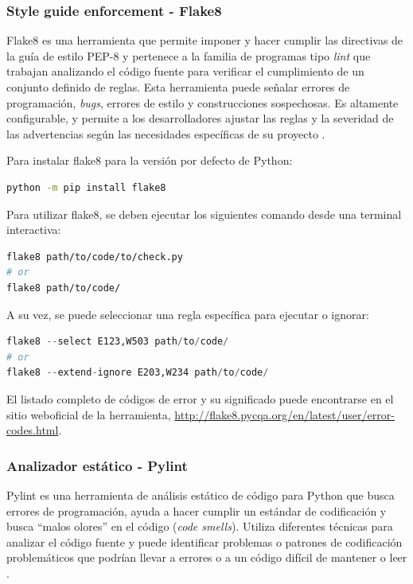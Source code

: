 \subsubsection{Style guide enforcement - Flake8}

Flake8 es una herramienta que permite imponer y hacer cumplir las directivas de la guía de estilo PEP-8 y pertenece a la familia de programas tipo \textit{lint} que trabajan analizando el código fuente para verificar el cumplimiento de un conjunto definido de reglas. Esta herramienta puede señalar errores de programación, \textit{bugs}, errores de estilo y construcciones sospechosas. Es altamente configurable, y permite a los desarrolladores ajustar las reglas y la severidad de las advertencias según las necesidades específicas de su proyecto \citep{flake8}.

Para instalar flake8 para la versión por defecto de Python:

\begin{lstlisting}[language=bash]
python -m pip install flake8
\end{lstlisting}

Para utilizar flake8, se deben ejecutar los siguientes comando desde una terminal interactiva:

\begin{lstlisting}[language=bash]
flake8 path/to/code/to/check.py
# or
flake8 path/to/code/
\end{lstlisting}


A su vez, se puede seleccionar una regla específica para ejecutar o ignorar:

\begin{lstlisting}[language={python}]
flake8 --select E123,W503 path/to/code/
# or
flake8 --extend-ignore E203,W234 path/to/code/
\end{lstlisting}

El listado completo de códigos de error y su significado puede encontrarse en el sitio weboficial de la herramienta, \url{http://flake8.pycqa.org/en/latest/user/error-codes.html}.

\subsubsection{Analizador estático - Pylint}
Pylint es una herramienta de análisis estático de código para Python que busca errores de programación, ayuda a hacer cumplir un estándar de codificación y busca ``malos olores'' en el código (\textit{code smells}). Utiliza diferentes técnicas para analizar el código fuente y puede identificar problemas o patrones de codificación problemáticos que podrían llevar a errores o a un código difícil de mantener o leer \citep{pylint}. 

